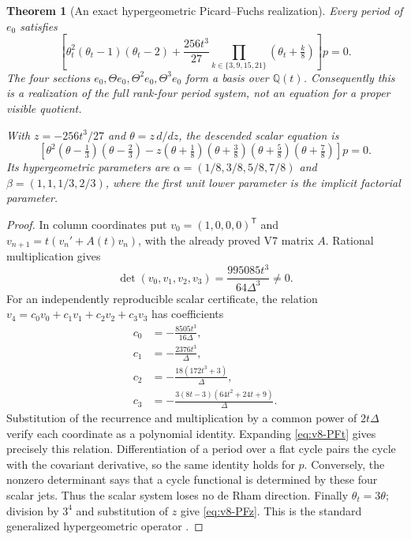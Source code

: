 \documentclass[11pt]{article}
\newtheorem{theorem}{Theorem}[section]
\theoremstyle{definition}
\theoremstyle{remark}
\newcommand{\Q}{\mathbb Q}
\begin{document}
\begin{theorem}[An exact hypergeometric Picard--Fuchs realization]
\label{thm:v8-PF}
Every period of $e_0$ satisfies
\begin{equation}
 \boxed{\left[
 \theta_t^2(\theta_t-1)(\theta_t-2)
 +\frac{256t^3}{27}\!\!\prod_{k\in\{3,9,15,21\}}
 (\theta_t+\tfrac{k}8)\right]p=0.}
 \label{eq:v8-PFt}
\end{equation}
The four sections $e_0,\Theta e_0,\Theta^2e_0,\Theta^3e_0$ form a basis
over $\Q(t)$. Consequently this is a realization of the full rank-four
period system, not an equation for a proper visible quotient.

With $z=-256t^3/27$ and $\theta=z\,d/dz$, the descended scalar equation is
\begin{equation}
 \boxed{\left[
 \theta^2(\theta-\tfrac13)(\theta-\tfrac23)
 -z(\theta+\tfrac18)(\theta+\tfrac38)
 (\theta+\tfrac58)(\theta+\tfrac78)
 \right]p=0.}
 \label{eq:v8-PFz}
\end{equation}
Its hypergeometric parameters are
$\alpha=(1/8,3/8,5/8,7/8)$ and $\beta=(1,1,1/3,2/3)$, where the first
unit lower parameter is the implicit factorial parameter.
\end{theorem}
\begin{proof}
In column coordinates put $v_0=(1,0,0,0)^{\mathsf T}$ and
$v_{n+1}=t(v_n'+A(t)v_n)$, with the already proved V7 matrix $A$.
Rational multiplication gives
\begin{equation}
 \det(v_0,v_1,v_2,v_3)
   =\frac{995085t^3}{64\Delta^3}\ne0.
 \label{eq:v8-scalar-det}
\end{equation}
For an independently reproducible scalar certificate, the relation
$v_4=c_0v_0+c_1v_1+c_2v_2+c_3v_3$ has coefficients
\[
 \begin{split}
 c_0&=-\frac{8505t^3}{16\Delta},\\
 c_1&=-\frac{2376t^3}{\Delta},\\
 c_2&=-\frac{18(172t^3+3)}{\Delta},\\
 c_3&=-\frac{3(8t-3)(64t^2+24t+9)}{\Delta}.
 \end{split}
\]
Substitution of the recurrence and multiplication by a common power of
$2t\Delta$ verify each coordinate as a polynomial identity. Expanding
\eqref{eq:v8-PFt} gives precisely this relation. Differentiation of a period
over a flat cycle pairs the cycle with the covariant derivative, so the same
identity holds for $p$. Conversely, the nonzero determinant says that a
cycle functional is determined by these four scalar jets. Thus the scalar
system loses no de Rham direction. Finally $\theta_t=3\theta$; division
by $3^4$ and substitution of $z$ give \eqref{eq:v8-PFz}. This is the
standard generalized hypergeometric operator \cite[\S16.8]{DLMFHyper}.
\end{proof}
\end{document}
